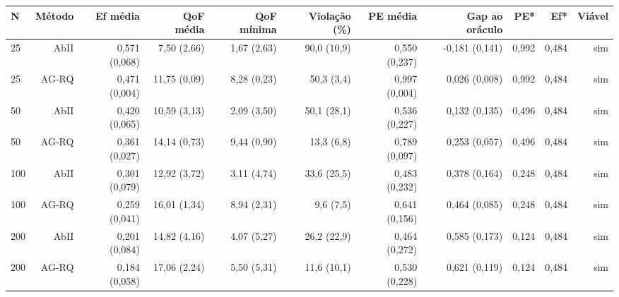 \begin{tabular}{lrrrrrrrrrr}
\toprule
N & Método & Ef média & QoF média & QoF mínima & Violação (\%) & PE média & Gap ao oráculo & PE* & Ef* & Viável \\
\midrule
25 & AbII & 0{,}571 (0{,}068) & 7{,}50 (2{,}66) & 1{,}67 (2{,}63) & 90{,}0 (10{,}9) & 0{,}550 (0{,}237) & -0{,}181 (0{,}141) & 0{,}992 & 0{,}484 & sim \\
25 & AG-RQ & 0{,}471 (0{,}004) & 11{,}75 (0{,}09) & 8{,}28 (0{,}23) & 50{,}3 (3{,}4) & 0{,}997 (0{,}004) & 0{,}026 (0{,}008) & 0{,}992 & 0{,}484 & sim \\
50 & AbII & 0{,}420 (0{,}065) & 10{,}59 (3{,}13) & 2{,}09 (3{,}50) & 50{,}1 (28{,}1) & 0{,}536 (0{,}227) & 0{,}132 (0{,}135) & 0{,}496 & 0{,}484 & sim \\
50 & AG-RQ & 0{,}361 (0{,}027) & 14{,}14 (0{,}73) & 9{,}44 (0{,}90) & 13{,}3 (6{,}8) & 0{,}789 (0{,}097) & 0{,}253 (0{,}057) & 0{,}496 & 0{,}484 & sim \\
100 & AbII & 0{,}301 (0{,}079) & 12{,}92 (3{,}72) & 3{,}11 (4{,}74) & 33{,}6 (25{,}5) & 0{,}483 (0{,}232) & 0{,}378 (0{,}164) & 0{,}248 & 0{,}484 & sim \\
100 & AG-RQ & 0{,}259 (0{,}041) & 16{,}01 (1{,}34) & 8{,}94 (2{,}31) & 9{,}6 (7{,}5) & 0{,}641 (0{,}156) & 0{,}464 (0{,}085) & 0{,}248 & 0{,}484 & sim \\
200 & AbII & 0{,}201 (0{,}084) & 14{,}82 (4{,}16) & 4{,}07 (5{,}27) & 26{,}2 (22{,}9) & 0{,}464 (0{,}272) & 0{,}585 (0{,}173) & 0{,}124 & 0{,}484 & sim \\
200 & AG-RQ & 0{,}184 (0{,}058) & 17{,}06 (2{,}24) & 5{,}50 (5{,}31) & 11{,}6 (10{,}1) & 0{,}530 (0{,}228) & 0{,}621 (0{,}119) & 0{,}124 & 0{,}484 & sim \\
\bottomrule
\end{tabular}
